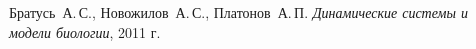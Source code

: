 \documentclass[oneside, final, 12pt]{article}
\begin{document}
\)
\newpage
\clearpage
\begin{thebibliography}{0}
	Братусь~А.\,С., Новожилов~А.\,С., Платонов~А.\,П. \label{Bratus_book}
	\emph{Динамические системы и модели биологии},
	2011 г.
\end{thebibliography}
\end{document}
